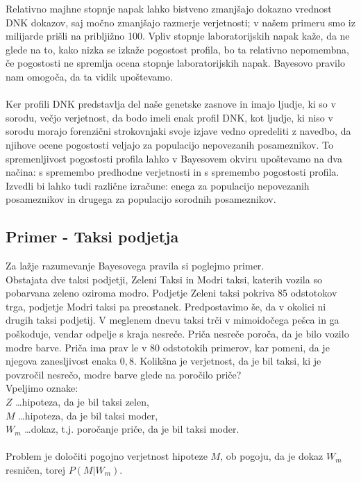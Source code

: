 \documentclass[12pt,a4paper]{amsart}
\theoremstyle{definition} %
\theoremstyle{plain} %
\begin{document}
Relativno majhne stopnje napak lahko bistveno zmanjšajo dokazno vrednost DNK dokazov, saj močno zmanjšajo razmerje verjetnosti; v našem primeru 
smo iz milijarde prišli na pribljižno 100. Vpliv stopnje laboratorijskih napak kaže, da ne glede na to, kako nizka se izkaže pogostost profila, 
bo ta relativno nepomembna, če pogostosti ne spremlja ocena stopnje laboratorijskih napak. Bayesovo pravilo nam omogoča, da ta vidik upoštevamo.\\\\
Ker profili DNK predstavlja del naše genetske zasnove in imajo ljudje, ki so v sorodu, večjo verjetnost, da bodo imeli enak profil DNK, kot ljudje, 
ki niso v sorodu morajo forenzični strokovnjaki svoje izjave vedno opredeliti z navedbo, da njihove ocene pogostosti veljajo za populacijo nepovezanih 
posameznikov. To spremenljivost pogostosti profila lahko v Bayesovem okviru upoštevamo na dva načina: s spremembo predhodne verjetnosti in s 
spremembo pogostosti profila. Izvedli bi lahko tudi različne izračune: enega za populacijo nepovezanih posameznikov in drugega za populacijo 
sorodnih posameznikov.

\subsection{Primer - Taksi podjetja}
Za lažje razumevanje Bayesovega pravila si poglejmo primer. \\

Obstajata dve taksi podjetji, Zeleni Taksi in Modri taksi, katerih vozila so pobarvana zeleno oziroma modro. Podjetje Zeleni taksi pokriva 
85 odstotokov trga, podjetje Modri taksi pa preostanek. Predpostavimo še, da v okolici ni drugih taksi podjetij. V meglenem dnevu taksi trči 
v mimoidočega pešca in ga poškoduje, vendar odpelje s kraja nesreče. Priča nesreče poroča, da je bilo vozilo modre barve. Priča ima prav le 
v 80 odstotokih primerov, kar pomeni, da je njegova zanesljivost enaka $0,8$. Kolikšna je verjetnost, da je bil taksi, ki je povzročil nesrečo, 
modre barve glede na poročilo priče? \\

Vpeljimo oznake:\\
$Z$ \dots hipoteza, da je bil taksi zelen, \\
$M$ \dots hipoteza, da je bil taksi moder, \\
$W_m$ \dots dokaz, t.j. poročanje priče, da je bil taksi moder. \\ \\
Problem je določiti pogojno verjetnost hipoteze $M$, ob pogoju, da je dokaz $W_m$ resničen, torej $P(M \lvert W_m)$. \\
\end{document}
